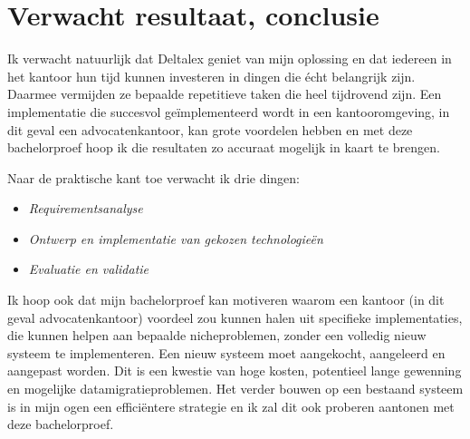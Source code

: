 \section{Verwacht resultaat, conclusie}%
\label{sec:verwachte_resultaten}
Ik verwacht natuurlijk dat Deltalex geniet van mijn oplossing en dat iedereen in het kantoor hun tijd kunnen investeren in dingen die écht belangrijk zijn. Daarmee vermijden ze bepaalde repetitieve taken die heel tijdrovend zijn. Een implementatie die succesvol geïmplementeerd wordt in een kantooromgeving, in dit geval een advocatenkantoor, kan grote voordelen hebben en met deze bachelorproef hoop ik die resultaten zo accuraat mogelijk in kaart te brengen.

Naar de praktische kant toe verwacht ik drie dingen:
\begin{itemize}
	\item \emph{Requirementsanalyse}
	\item \emph{Ontwerp en implementatie van gekozen technologieën}
	\item \emph{Evaluatie en validatie}
\end{itemize}

Ik hoop ook dat mijn bachelorproef kan motiveren waarom een kantoor (in dit geval advocatenkantoor) voordeel zou kunnen halen uit specifieke implementaties, die kunnen helpen aan bepaalde nicheproblemen, zonder een volledig nieuw systeem te implementeren. Een nieuw systeem moet aangekocht, aangeleerd en aangepast worden. Dit is een kwestie van hoge kosten, potentieel lange gewenning en mogelijke datamigratieproblemen. Het verder bouwen op een bestaand systeem is in mijn ogen een efficiëntere strategie en ik zal dit ook proberen aantonen met deze bachelorproef.  
